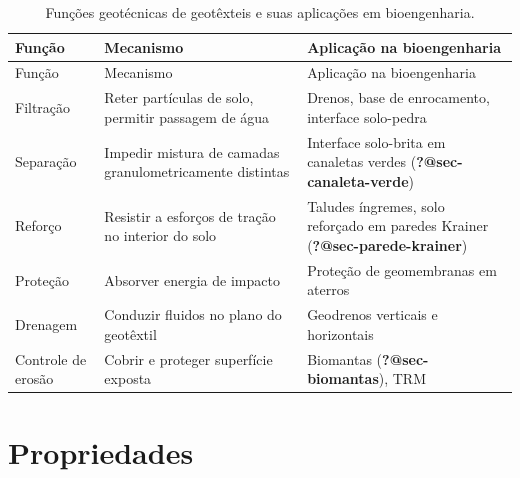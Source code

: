 \documentclass[
  portuguese,
  11pt,
  a4paper,
  open=any]{scrbook}
\begin{document}
\begin{longtable}[]{@{}
  >{\raggedright\arraybackslash}p{}
  >{\raggedright\arraybackslash}p{}
  >{\raggedright\arraybackslash}p{}@{}}
\caption{Funções geotécnicas de geotêxteis e suas aplicações em
bioengenharia.}\label{tbl-funcoes}\tabularnewline
\toprule\noalign{}
\begin{minipage}[b]{\linewidth}\raggedright
Função
\end{minipage} & \begin{minipage}[b]{\linewidth}\raggedright
Mecanismo
\end{minipage} & \begin{minipage}[b]{\linewidth}\raggedright
Aplicação na bioengenharia
\end{minipage} \\
\midrule\noalign{}
\endfirsthead
\toprule\noalign{}
\begin{minipage}[b]{\linewidth}\raggedright
Função
\end{minipage} & \begin{minipage}[b]{\linewidth}\raggedright
Mecanismo
\end{minipage} & \begin{minipage}[b]{\linewidth}\raggedright
Aplicação na bioengenharia
\end{minipage} \\
\midrule\noalign{}
\endhead
\bottomrule\noalign{}
\endlastfoot
Filtração & Reter partículas de solo, permitir passagem de água &
Drenos, base de enrocamento, interface solo-pedra \\
Separação & Impedir mistura de camadas granulometricamente distintas &
Interface solo-brita em canaletas verdes
(\textbf{?@sec-canaleta-verde}) \\
Reforço & Resistir a esforços de tração no interior do solo & Taludes
íngremes, solo reforçado em paredes Krainer
(\textbf{?@sec-parede-krainer}) \\
Proteção & Absorver energia de impacto & Proteção de geomembranas em
aterros \\
Drenagem & Conduzir fluidos no plano do geotêxtil & Geodrenos verticais
e horizontais \\
Controle de erosão & Cobrir e proteger superfície exposta & Biomantas
(\textbf{?@sec-biomantas}), TRM \\
\end{longtable}

\section{Propriedades}\label{propriedades}
\end{document}
